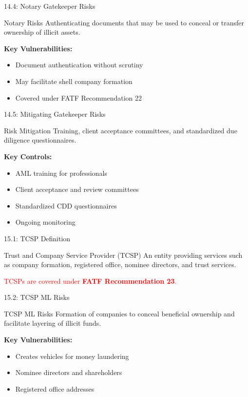 \documentclass{beamer}
\begin{document}
	\begin{frame}{14.4: Notary Gatekeeper Risks}
		\begin{block}{Notary Risks}
			Authenticating documents that may be used to conceal or transfer ownership of illicit assets.
		\end{block}
		\textbf{Key Vulnerabilities:}
		\begin{itemize}
			\item Document authentication without scrutiny
			\item May facilitate shell company formation
			\item Covered under FATF Recommendation 22
		\end{itemize}
	\end{frame}
	
	\begin{frame}{14.5: Mitigating Gatekeeper Risks}
		\begin{block}{Risk Mitigation}
			Training, client acceptance committees, and standardized due diligence questionnaires.
		\end{block}
		\textbf{Key Controls:}
		\begin{itemize}
			\item AML training for professionals
			\item Client acceptance and review committees
			\item Standardized CDD questionnaires
			\item Ongoing monitoring
		\end{itemize}
	\end{frame}
	
	
	\begin{frame}{15.1: TCSP Definition}
		\begin{block}{Trust and Company Service Provider (TCSP)}
			An entity providing services such as company formation, registered office, nominee directors, and trust services.
		\end{block}
		\textcolor{red}{TCSPs are covered under \textbf{FATF Recommendation 23}.}
	\end{frame}
	
	\begin{frame}{15.2: TCSP ML Risks}
		\begin{block}{TCSP ML Risks}
			Formation of companies to conceal beneficial ownership and facilitate layering of illicit funds.
		\end{block}
		\textbf{Key Vulnerabilities:}
		\begin{itemize}
			\item Creates vehicles for money laundering
			\item Nominee directors and shareholders
			\item Registered office addresses
		\end{itemize}
	\end{frame}
	
\end{document}

